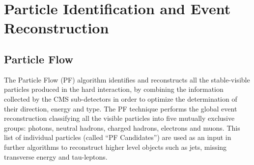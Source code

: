 \chapter[Particle Identification and Event Reconstruction]{Particle Identification and Event Reconstruction}
\label{chap:ParticleID}




\section{Particle Flow}
\label{sec:PF}

The Particle Flow (PF) algorithm \cite{CMS-PAS-PFT-09-001} identifies and reconstructs all the stable-visible particles produced in the hard interaction, by
combining the information collected by the CMS sub-detectors in order to optimize the determination of their direction, energy and type. The PF 
technique performs the global event reconstruction classifying all the visible particles into five mutually exclusive groups: photons, 
neutral hadrons, charged hadrons, electrons and muons. This list of individual particles (called ``PF Candidates'') are used 
as an input in further algorithms to reconstruct higher level objects such as jets, missing transverse energy and tau-leptons. \\



